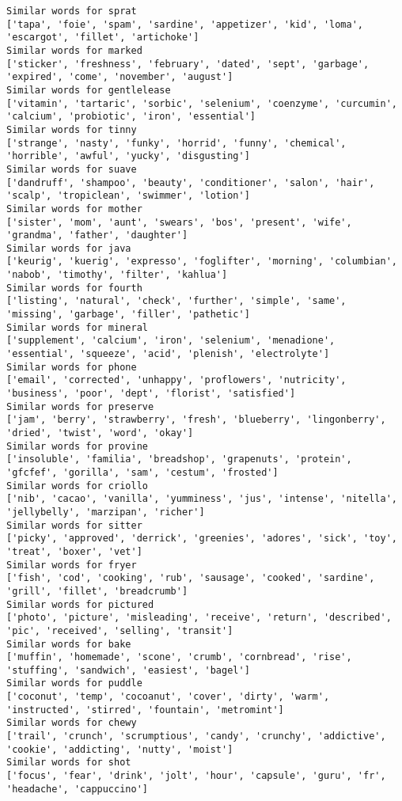 \documentclass[11pt]{article}
\begin{document}
\begin{Verbatim}[commandchars=\\\{\}]
Similar words for sprat
['tapa', 'foie', 'spam', 'sardine', 'appetizer', 'kid', 'loma', 'escargot', 'fillet', 'artichoke']
Similar words for marked
['sticker', 'freshness', 'february', 'dated', 'sept', 'garbage', 'expired', 'come', 'november', 'august']
Similar words for gentlelease
['vitamin', 'tartaric', 'sorbic', 'selenium', 'coenzyme', 'curcumin', 'calcium', 'probiotic', 'iron', 'essential']
Similar words for tinny
['strange', 'nasty', 'funky', 'horrid', 'funny', 'chemical', 'horrible', 'awful', 'yucky', 'disgusting']
Similar words for suave
['dandruff', 'shampoo', 'beauty', 'conditioner', 'salon', 'hair', 'scalp', 'tropiclean', 'swimmer', 'lotion']
Similar words for mother
['sister', 'mom', 'aunt', 'swears', 'bos', 'present', 'wife', 'grandma', 'father', 'daughter']
Similar words for java
['keurig', 'kuerig', 'expresso', 'foglifter', 'morning', 'columbian', 'nabob', 'timothy', 'filter', 'kahlua']
Similar words for fourth
['listing', 'natural', 'check', 'further', 'simple', 'same', 'missing', 'garbage', 'filler', 'pathetic']
Similar words for mineral
['supplement', 'calcium', 'iron', 'selenium', 'menadione', 'essential', 'squeeze', 'acid', 'plenish', 'electrolyte']
Similar words for phone
['email', 'corrected', 'unhappy', 'proflowers', 'nutricity', 'business', 'poor', 'dept', 'florist', 'satisfied']
Similar words for preserve
['jam', 'berry', 'strawberry', 'fresh', 'blueberry', 'lingonberry', 'dried', 'twist', 'word', 'okay']
Similar words for provine
['insoluble', 'familia', 'breadshop', 'grapenuts', 'protein', 'gfcfef', 'gorilla', 'sam', 'cestum', 'frosted']
Similar words for criollo
['nib', 'cacao', 'vanilla', 'yumminess', 'jus', 'intense', 'nitella', 'jellybelly', 'marzipan', 'richer']
Similar words for sitter
['picky', 'approved', 'derrick', 'greenies', 'adores', 'sick', 'toy', 'treat', 'boxer', 'vet']
Similar words for fryer
['fish', 'cod', 'cooking', 'rub', 'sausage', 'cooked', 'sardine', 'grill', 'fillet', 'breadcrumb']
Similar words for pictured
['photo', 'picture', 'misleading', 'receive', 'return', 'described', 'pic', 'received', 'selling', 'transit']
Similar words for bake
['muffin', 'homemade', 'scone', 'crumb', 'cornbread', 'rise', 'stuffing', 'sandwich', 'easiest', 'bagel']
Similar words for puddle
['coconut', 'temp', 'cocoanut', 'cover', 'dirty', 'warm', 'instructed', 'stirred', 'fountain', 'metromint']
Similar words for chewy
['trail', 'crunch', 'scrumptious', 'candy', 'crunchy', 'addictive', 'cookie', 'addicting', 'nutty', 'moist']
Similar words for shot
['focus', 'fear', 'drink', 'jolt', 'hour', 'capsule', 'guru', 'fr', 'headache', 'cappuccino']

\end{Verbatim}
\end{document}
